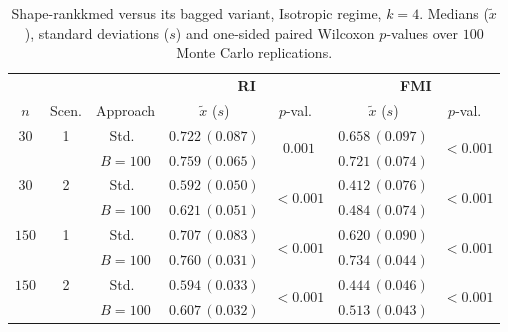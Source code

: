 \documentclass[11pt,a4paper]{article}
\begin{document}
\begin{table}[h]
\centering
\caption{Shape-rankkmed versus its bagged variant, Isotropic regime, $k=4$. Medians ($\tilde x$), standard deviations ($s$) and one-sided paired Wilcoxon $p$-values over $100$ Monte Carlo replications.}
\label{tab:rkm-iso-k4}
\footnotesize
\begin{tabular}{cc c cc cc}
\toprule
& & & \multicolumn{2}{c}{\textbf{RI}} & \multicolumn{2}{c}{\textbf{FMI}} \\
\cmidrule(lr){4-5}\cmidrule(lr){6-7}
$n$ & Scen. & Approach & $\tilde x$ ($s$) & $p$-val.\ & $\tilde x$ ($s$) & $p$-val.\ \\
\midrule
$30$ & 1 & Std.\ & $0.722\,(0.087)$ & \multirow{2}{*}{$\mathbf{0.001}$} & $0.658\,(0.097)$ & \multirow{2}{*}{$\mathbf{<\!0.001}$} \\
     &   & $B{=}100$ & $0.759\,(0.065)$ & & $0.721\,(0.074)$ & \\
$30$ & 2 & Std.\ & $0.592\,(0.050)$ & \multirow{2}{*}{$\mathbf{<\!0.001}$} & $0.412\,(0.076)$ & \multirow{2}{*}{$\mathbf{<\!0.001}$} \\
     &   & $B{=}100$ & $0.621\,(0.051)$ & & $0.484\,(0.074)$ & \\
$150$ & 1 & Std.\ & $0.707\,(0.083)$ & \multirow{2}{*}{$\mathbf{<\!0.001}$} & $0.620\,(0.090)$ & \multirow{2}{*}{$\mathbf{<\!0.001}$} \\
     &   & $B{=}100$ & $0.760\,(0.031)$ & & $0.734\,(0.044)$ & \\
$150$ & 2 & Std.\ & $0.594\,(0.033)$ & \multirow{2}{*}{$\mathbf{<\!0.001}$} & $0.444\,(0.046)$ & \multirow{2}{*}{$\mathbf{<\!0.001}$} \\
     &   & $B{=}100$ & $0.607\,(0.032)$ & & $0.513\,(0.043)$ & \\
\bottomrule
\end{tabular}
\end{table}
\end{document}
